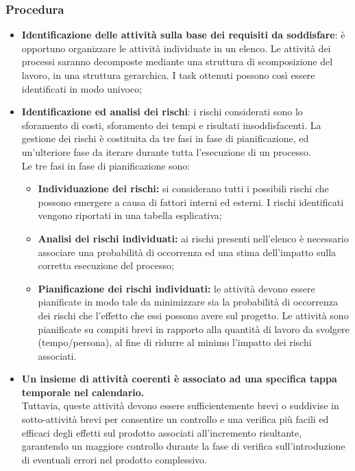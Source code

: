 \subsubsection{Procedura}
\begin{itemize}
    \item \textbf{Identificazione delle attività sulla base dei requisiti da soddisfare}: è opportuno organizzare le attività individuate in un elenco. Le attività dei processi saranno decomposte mediante una struttura di scomposizione del lavoro, in una struttura gerarchica. I task ottenuti possono così essere identificati in modo univoco;
    \item \textbf{Identificazione ed analisi dei rischi}: i rischi considerati sono lo sforamento di costi, sforamento dei tempi e risultati insoddisfacenti. La gestione dei rischi è costituita da tre fasi in fase di pianificazione, ed un'ulteriore fase da iterare durante tutta l'esecuzione di un processo. \\
    Le tre fasi in fase di pianificazione sono: 
    \begin{itemize}
     \item \textbf{Individuazione dei rischi:} si considerano tutti i possibili rischi che possono emergere a causa di fattori interni ed esterni. I rischi identificati vengono riportati in una tabella esplicativa;
     \item \textbf{Analisi dei rischi individuati:} ai rischi presenti nell'elenco è necessario associare una probabilità di occorrenza ed una stima dell'impatto sulla corretta esecuzione del processo;
     \item \textbf{Pianificazione dei rischi individuati:} le attività devono essere pianificate in modo tale da minimizzare sia la probabilità di occorrenza dei rischi che l'effetto che essi possono avere sul progetto. Le attività sono pianificate su compiti brevi in rapporto alla quantità di lavoro da svolgere (tempo/persona), al fine di ridurre al minimo l'impatto dei rischi associati.
    \end{itemize}
     \item \textbf{Un insieme di attività coerenti è associato ad una specifica tappa temporale nel calendario.}\\ Tuttavia, queste attività devono essere sufficientemente brevi o suddivise in sotto-attività brevi per consentire un controllo e una verifica più facili ed efficaci degli effetti sul prodotto associati all'incremento risultante, garantendo un maggiore controllo durante la fase di verifica sull'introduzione di eventuali errori nel prodotto complessivo. \\ 

\end{itemize}
